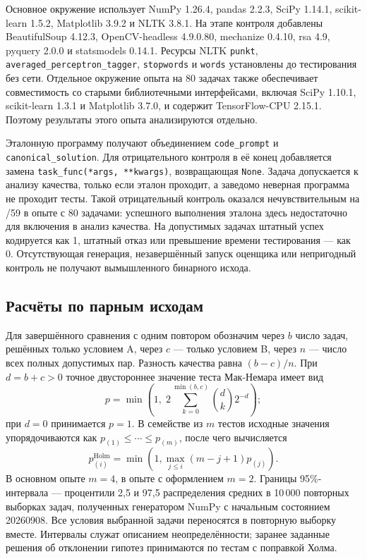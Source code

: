 Основное окружение использует NumPy 1.26.4, pandas 2.2.3, SciPy 1.14.1, scikit-learn 1.5.2, Matplotlib 3.9.2 и NLTK 3.8.1. На этапе контроля добавлены BeautifulSoup 4.12.3, OpenCV-headless 4.9.0.80, mechanize 0.4.10, rsa 4.9, pyquery 2.0.0 и statsmodels 0.14.1. Ресурсы NLTK \texttt{punkt}, \texttt{averaged\_perceptron\_tagger}, \texttt{stopwords} и \texttt{words} установлены до тестирования без сети. Отдельное окружение опыта на 80 задачах также обеспечивает совместимость со старыми библиотечными интерфейсами, включая SciPy 1.10.1, scikit-learn 1.3.1 и Matplotlib 3.7.0, и содержит TensorFlow-CPU 2.15.1. Поэтому результаты этого опыта анализируются отдельно.

Эталонную программу получают объединением \texttt{code\_prompt} и \texttt{canonical\_solution}. Для отрицательного контроля в её конец добавляется замена \texttt{task\_func(*args, **kwargs)}, возвращающая \texttt{None}. Задача допускается к анализу качества, только если эталон проходит, а заведомо неверная программа не проходит тесты. Такой отрицательный контроль оказался нечувствительным на /59 в опыте с 80 задачами: успешного выполнения эталона здесь недостаточно для включения в анализ качества. На допустимых задачах штатный успех кодируется как 1, штатный отказ или превышение времени тестирования --- как 0. Отсутствующая генерация, незавершённый запуск оценщика или непригодный контроль не получают вымышленного бинарного исхода.

\subsection{Расчёты по парным исходам}
Для завершённого сравнения с одним повтором обозначим через $b$ число задач, решённых только условием A, через $c$ --- только условием B, через $n$ --- число всех полных допустимых пар. Разность качества равна $(b-c)/n$. При $d=b+c>0$ точное двустороннее значение теста Мак-Немара имеет вид
\[
p=\min\left(1,\;2\sum_{k=0}^{\min(b,c)}{d\choose k}2^{-d}\right);
\]
при $d=0$ принимается $p=1$. В семействе из $m$ тестов исходные значения упорядочиваются как $p_{(1)}\le\cdots\le p_{(m)}$, после чего вычисляется
\[
p^{\mathrm{Holm}}_{(i)}
=\min\left(1,\max_{j\le i}(m-j+1)p_{(j)}\right).
\]
В основном опыте $m=4$, в опыте с оформлением $m=2$. Границы 95\%-интервала --- процентили 2,5 и 97,5 распределения средних в 10\,000 повторных выборках задач, полученных генератором NumPy с начальным состоянием 20260908. Все условия выбранной задачи переносятся в повторную выборку вместе. Интервалы служат описанием неопределённости; заранее заданные решения об отклонении гипотез принимаются по тестам с поправкой Холма.

